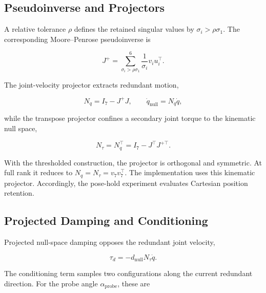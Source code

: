 \subsection{Pseudoinverse and Projectors}
\label{subsec:svd_pseudoinverse}
\label{subsec:nullspace_projectors}

A relative tolerance \mbox{\(\rho\)} defines the retained singular values by
\mbox{\(\sigma_i>\rho\sigma_1\)}. The corresponding Moore--Penrose
pseudoinverse is

\begin{equation}
J^+=
\sum_{\sigma_i>\rho\sigma_1}^{6}
\frac{1}{\sigma_i}v_i u_i^\top.
\label{eq:svd_pseudoinverse}
\end{equation}

The joint-velocity projector extracts redundant motion,

\begin{equation}
N_q=I_7-J^+J,
\qquad
\dot q_{\mathrm{null}}=N_q\dot q,
\label{eq:nullspace_velocity_projector}
\end{equation}

while the transpose projector confines a secondary joint torque to the
kinematic null space,

\begin{equation}
N_\tau=N_q^\top=I_7-J^\top J^{+\top}.
\label{eq:nullspace_torque_projector}
\end{equation}

With the thresholded \mbox{} construction, the projector is
orthogonal and symmetric. At full rank it reduces to
\mbox{\(N_q=N_\tau=v_7v_7^\top\)}. The implementation uses this kinematic
projector. Accordingly, the pose-hold experiment evaluates Cartesian position
retention.

\subsection{Projected Damping and Conditioning}
\label{subsec:nullspace_damping_torque}
\label{subsec:singular_value_conditioning_torque}

Projected null-space damping opposes the redundant joint velocity,

\begin{equation}
\tau_d=-d_{\mathrm{null}}N_\tau\dot q.
\label{eq:nullspace_damping_torque}
\end{equation}

The conditioning term samples two configurations along the current redundant
direction. For the probe angle \mbox{\(\alpha_{\mathrm{probe}}\)}, these are

